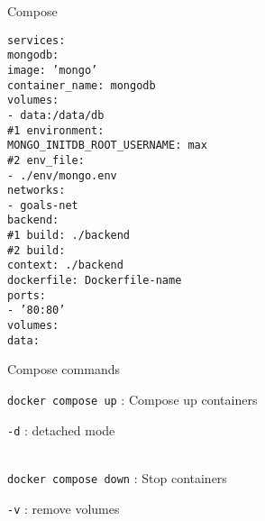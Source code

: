 \documentclass[10pt]{article}
\newcommand{\code}[1]{{\color{teal}\texttt{#1}}}
\newcommand{\cmd}[3][.3]{\code{#2} : #3 \\[#1em]}
\newcommand{\opts}[2][.5]{\hspace*{.5cm}\begin{minipage}{0.9\textwidth}
  #2
  \vspace*{-1em}
\end{minipage}\\[#1em]}
\newcommand{\opt}[2]{
  \code{#1} : #2 \\
}
\newcommand{\cluster}[2]{\begin{mybox}{#1}
  #2
  \vspace*{-1.3em}
\end{mybox}}
\begin{document}
\begin{multicols*}{2}

  \cluster{Compose}{
  \code{services:\\
  \hspace*{1em}mongodb: \\
  \hspace*{2em}image: 'mongo' \\
  \hspace*{2em}container\_name: mongodb \\
  \hspace*{2em}volumes: \\
  \hspace*{3em}- data:{\slash}data{\slash}db \\
  \hspace*{2em}\#1 environment: \\
  \hspace*{3em}MONGO\_INITDB\_ROOT\_USERNAME: max \\
  \hspace*{2em}\#2 env\_file: \\
  \hspace*{3em}- .{\slash}env{\slash}mongo.env \\
  \hspace*{2em}networks: \\
  \hspace*{3em}- goals-net \\
  \hspace*{1em}backend: \\
  \hspace*{2em}\#1 build: .{\slash}backend \\
  \hspace*{2em}\#2 build: \\
  \hspace*{3em}context: .{\slash}backend \\
  \hspace*{3em}dockerfile: Dockerfile-name \\
  \hspace*{2em}ports: \\
  \hspace*{3em}- '80:80' \\
  volumes: \\
  \hspace*{1em}data: \\
  }
  }

  \cluster{Compose commands}{
    \cmd{docker compose up}{Compose up containers}
    \opts{
      \opt{-d}{detached mode}
    }
    \cmd{docker compose down}{Stop containers}
    \opts{
      \opt{-v}{remove volumes}
    }
  }

\end{multicols*}
\end{document}
